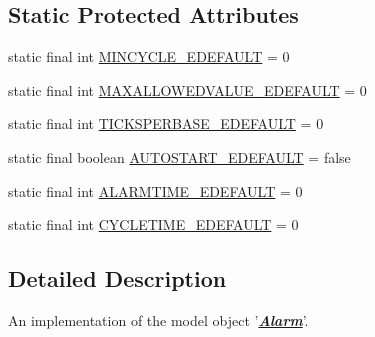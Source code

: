 \subsection*{Static Protected Attributes}
\begin{DoxyCompactItemize}
\item 
static final int \hyperlink{classshootingmachineemfmodel_1_1impl_1_1_alarm_impl_a292caf682730a300a1517d0a42910743}{M\-I\-N\-C\-Y\-C\-L\-E\-\_\-\-E\-D\-E\-F\-A\-U\-L\-T} = 0
\item 
static final int \hyperlink{classshootingmachineemfmodel_1_1impl_1_1_alarm_impl_af80742cf00da4bbdb1a55441e3e18835}{M\-A\-X\-A\-L\-L\-O\-W\-E\-D\-V\-A\-L\-U\-E\-\_\-\-E\-D\-E\-F\-A\-U\-L\-T} = 0
\item 
static final int \hyperlink{classshootingmachineemfmodel_1_1impl_1_1_alarm_impl_a3c3b372b88aaa3f67b535965a8c3262a}{T\-I\-C\-K\-S\-P\-E\-R\-B\-A\-S\-E\-\_\-\-E\-D\-E\-F\-A\-U\-L\-T} = 0
\item 
static final boolean \hyperlink{classshootingmachineemfmodel_1_1impl_1_1_alarm_impl_ae3645bdaa1939ee466b393bec08d2ad3}{A\-U\-T\-O\-S\-T\-A\-R\-T\-\_\-\-E\-D\-E\-F\-A\-U\-L\-T} = false
\item 
static final int \hyperlink{classshootingmachineemfmodel_1_1impl_1_1_alarm_impl_ab1311546de8d5b8a4a39f776185907f8}{A\-L\-A\-R\-M\-T\-I\-M\-E\-\_\-\-E\-D\-E\-F\-A\-U\-L\-T} = 0
\item 
static final int \hyperlink{classshootingmachineemfmodel_1_1impl_1_1_alarm_impl_a8014dd85bb93f14eda34c8ba7fd6e572}{C\-Y\-C\-L\-E\-T\-I\-M\-E\-\_\-\-E\-D\-E\-F\-A\-U\-L\-T} = 0
\end{DoxyCompactItemize}


\subsection{Detailed Description}
An implementation of the model object '{\itshape {\bfseries \hyperlink{interfaceshootingmachineemfmodel_1_1_alarm}{Alarm}}}'.

